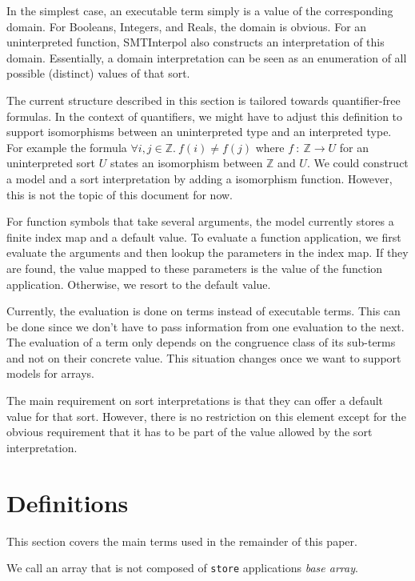 \documentclass[a4paper,12pt]{article}
\newcommand\si{SMTInterpol\xspace}
\begin{document}
In the simplest case, an executable term simply is a value of the
corresponding domain.  For Booleans, Integers, and Reals, the domain is
obvious.  For an uninterpreted function, \si also constructs an interpretation
of this domain.  Essentially, a domain interpretation can be seen as an
enumeration of all possible (distinct) values of that sort.  
\begin{rem}
  The current structure described in this section is tailored towards
  quantifier-free formulas.  In the context of quantifiers, we might have to
  adjust this definition to support isomorphisms between an uninterpreted type
  and an interpreted type.  For example the formula $\forall
  i,j\in\mathbb{Z}.\ f(i) \neq f(j)$ where $f\ :\ \mathbb{Z}\rightarrow U$ for
  an uninterpreted sort $U$ states an isomorphism between $\mathbb{Z}$ and
  $U$.  We could construct a model and a sort interpretation by adding a
  isomorphism function.  However, this is not the topic of this document for
  now.
\end{rem}

For function symbols that take several arguments, the model currently stores a
finite index map and a default value.  To evaluate a function application, we
first evaluate the arguments and then lookup the parameters in the index map.
If they are found, the value mapped to these parameters is the value of the
function application.  Otherwise, we resort to the default value.

Currently, the evaluation is done on terms instead of executable terms.  This
can be done since we don't have to pass information from one evaluation to the
next.  The evaluation of a term only depends on the congruence class of its
sub-terms and not on their concrete value.  This situation changes once we
want to support models for arrays.

The main requirement on sort interpretations is that they can offer a default
value for that sort.  However, there is no restriction on this element except
for the obvious requirement that it has to be part of the value allowed by the
sort interpretation.

\section{Definitions}
This section covers the main terms used in the remainder of this paper.

\begin{defn}
  We call an array that is not composed of \verb+store+ applications
  \emph{base array}.
\end{defn}
\end{document}

